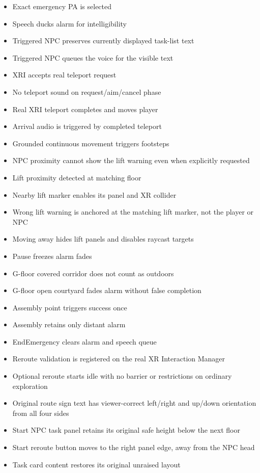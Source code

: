 \documentclass[12pt,a4paper]{article}
\begin{document}
\begin{itemize}[leftmargin=*,nosep]
\item Exact emergency PA is selected
\item Speech ducks alarm for intelligibility
\item Triggered NPC preserves currently displayed task-list text
\item Triggered NPC queues the voice for the visible text
\item XRI accepts real teleport request
\item No teleport sound on request/aim/cancel phase
\item Real XRI teleport completes and moves player
\item Arrival audio is triggered by completed teleport
\item Grounded continuous movement triggers footsteps
\item NPC proximity cannot show the lift warning even when explicitly requested
\item Lift proximity detected at matching floor
\item Nearby lift marker enables its panel and XR collider
\item Wrong lift warning is anchored at the matching lift marker, not the player or NPC
\item Moving away hides lift panels and disables raycast targets
\item Pause freezes alarm fades
\item G-floor covered corridor does not count as outdoors
\item G-floor open courtyard fades alarm without false completion
\item Assembly point triggers success once
\item Assembly retains only distant alarm
\item EndEmergency clears alarm and speech queue
\item Reroute validation is registered on the real XR Interaction Manager
\item Optional reroute starts idle with no barrier or restrictions on ordinary exploration
\item Original route sign text has viewer-correct left/right and up/down orientation from all four sides
\item Start NPC task panel retains its original safe height below the next floor
\item Start reroute button moves to the right panel edge, away from the NPC head
\item Task card content restores its original unraised layout

\end{itemize}
\end{document}
